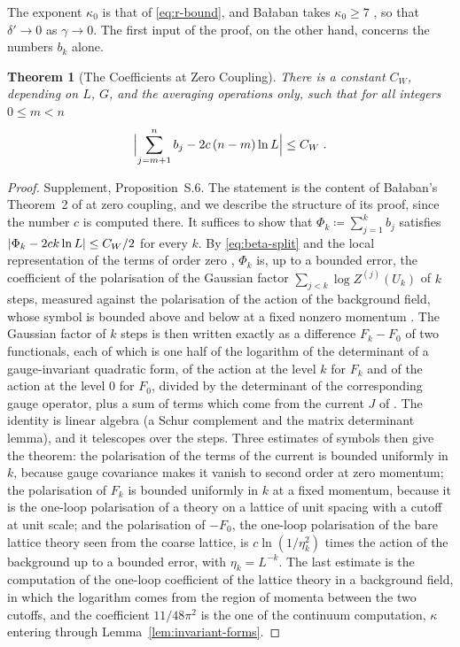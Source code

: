 \documentclass[11pt]{preprint}
\DeclarePairedDelimiter{\abs}{\lvert}{\rvert}
\numberwithin{equation}{section}
\newtheorem{theorem}{Theorem}[section]
\theoremstyle{definition}
\theoremstyle{remark}
\theoremstyle{plain}
\begin{document}
The exponent $\kappa_0$ is that of \eqref{eq:r-bound}, and Ba{\l}aban takes $\kappa_0 \geq 7$ \cite[(2.46), p.~263]{BalabanCRE}, so that $\delta' \to 0$ as $\gamma \to 0$. The first input of the proof, on the other hand, concerns the numbers $b_k$ alone.

\begin{theorem}[The Coefficients at Zero Coupling]\label{thm:one-loop-window}
There is a constant $C_W$, depending on $L$, $G$, and the averaging operations only, such that for all integers $0 \leq m < n$
\begin{equation}\label{eq:one-loop-window}
    \Bigl\lvert\sum_{j=m+1}^{n}b_j - 2c\,(n - m)\ln L\Bigr\rvert \leq C_W\;.
\end{equation}
\end{theorem}

\begin{proof}
Supplement, Proposition~S.6. The statement is the content of Ba{\l}aban's Theorem~2 of \cite{BalabanRG1} at zero coupling, and we describe the structure of its proof, since the number $c$ is computed there. It suffices to show that $\Phi_k \coloneqq \sum_{j=1}^{k}b_j$ satisfies $\abs{\Phi_k - 2ck\ln L} \leq C_W/2$ for every $k$. By \eqref{eq:beta-split} and the local representation of the terms of order zero \cite[(0.28)--(0.30), p.~258]{BalabanRG1}, $\Phi_k$ is, up to a bounded error, the coefficient of the polarisation of the Gaussian factor $\sum_{j<k}\log Z^{(j)}(U_k)$ of $k$ steps, measured against the polarisation of the action of the background field, whose symbol is bounded above and below at a fixed nonzero momentum \cite[(1.67), p.~29]{BalabanPRT1}. The Gaussian factor of $k$ steps is then written exactly as a difference $F_k - F_0$ of two functionals, each of which is one half of the logarithm of the determinant of a gauge-invariant quadratic form, of the action at the level $k$ for $F_k$ and of the action at the level $0$ for $F_0$, divided by the determinant of the corresponding gauge operator, plus a sum of terms which come from the current $J$ of \cite[(1.5), (1.8), p.~261]{BalabanRG1}. The identity is linear algebra (a Schur complement and the matrix determinant lemma), and it telescopes over the steps. Three estimates of symbols then give the theorem: the polarisation of the terms of the current is bounded uniformly in $k$, because gauge covariance makes it vanish to second order at zero momentum; the polarisation of $F_k$ is bounded uniformly in $k$ at a fixed momentum, because it is the one-loop polarisation of a theory on a lattice of unit spacing with a cutoff at unit scale; and the polarisation of $-F_0$, the one-loop polarisation of the bare lattice theory seen from the coarse lattice, is $c\ln(1/\eta_k^2)$ times the action of the background up to a bounded error, with $\eta_k = L^{-k}$. The last estimate is the computation of the one-loop coefficient of the lattice theory in a background field, in which the logarithm comes from the region of momenta between the two cutoffs, and the coefficient $11/48\pi^2$ is the one of the continuum computation, $\kappa$ entering through Lemma~\ref{lem:invariant-forms}.
\end{proof}
\end{document}
